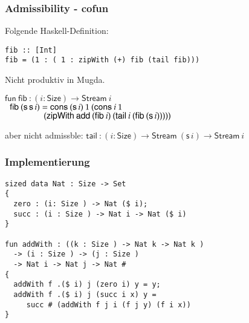 \documentclass[12pt,red,serif,mathserif]{beamer}
\newcommand{\s}{\mathsf{s}\,}
\newcommand{\Size}{\mathsf{Size}}
\newcommand{\fun}{\mathsf{fun}\:}
\newcommand{\add}{\mathsf{add}\:}
\newcommand{\cons}{\mathsf{cons}\:}
\newcommand{\Stream}{\mathsf{Stream}\:}
\newcommand{\tail}{\mathsf{tail}\:}
\newenvironment{bsp}
{\begin{list}{}{
\setlength{\leftmargin}{0cm}
\setlength{\rightmargin}{0cm}
}\item}{
\end {list}
}
\newcommand{\zipWith}{\mathsf{zipWith}\:}
\newcommand{\fib}{\mathsf{fib}\:}
\newcommand{\ra}{\rightarrow}
\newcommand{\spc}{\hspace*{2mm}}
\newcommand{\spcx}{\hspace*{8mm}}
\begin{document}
\begin{frame}[fragile]

\frametitle{ Admissibility - cofun }

\begin{itemize}
\item
Folgende Haskell-Definition:
\begin{bsp}
\begin{verbatim}
fib :: [Int]
fib = (1 : ( 1 : zipWith (+) fib (tail fib)))
\end{verbatim}
\end{bsp}
\vspace*{0.1cm}
\item
Nicht produktiv in Mugda.
\item
\begin{bsp}
$\fun \fib : (i : \Size ) \ra \Stream i$\\
$\spc \fib (\s \s i) = \cons (\s i) \: 1 \: (\cons i \: 1 \: $\\
$\spcx \spcx (\zipWith \add (\fib i) \: (\tail i \: (\fib (\s i)))))$
\end{bsp}
\item
\begin{bsp}
aber nicht admissble: $\tail : (i : \Size ) \ra \Stream (\s i) \ra \Stream i $\\
\end{bsp}
\end{itemize}

\end{frame}



\begin{frame}[fragile]

  \frametitle{Implementierung}

\begin{verbatim}
sized data Nat : Size -> Set
{
  zero : (i: Size ) -> Nat ($ i);
  succ : (i : Size ) -> Nat i -> Nat ($ i)
}

fun addWith : ((k : Size ) -> Nat k -> Nat k )
  -> (i : Size ) -> (j : Size )
  -> Nat i -> Nat j -> Nat #
{
  addWith f .($ i) j (zero i) y = y;
  addWith f .($ i) j (succ i x) y =
     succ # (addWith f j i (f j y) (f i x))
}
\end{verbatim}

\end{frame}
\end{document}
